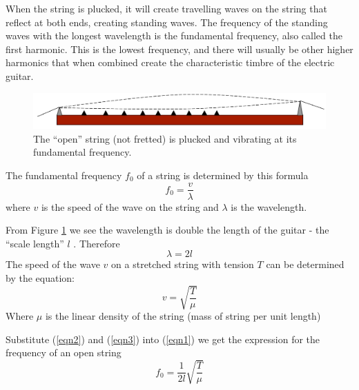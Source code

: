 
When the string is plucked, it will create travelling waves on the string that reflect at both ends, creating standing waves. The frequency of the standing waves with the longest wavelength is the fundamental frequency, also called the first harmonic. This is the lowest frequency, and there will usually be other higher harmonics that when combined create the characteristic timbre of the electric guitar. 
\begin{figure}[h]
    \includegraphics[width=\textwidth]{./ee/fig2.png}
    \caption{The “open” string (not fretted) is plucked and vibrating at its fundamental frequency.}\label{fig2}
\end{figure} 

The fundamental frequency $f_0$ of a string is determined by this formula
\begin{equation}\label{eqn1}
    f_0 = \frac{v}{\lambda}
\end{equation}
where $v$ is the speed of the wave on the string and $\lambda$ is the wavelength. \cite{eqn1} \par 
From Figure \ref{fig2} we see the wavelength is double the length of the guitar - the “scale length” $l$ . Therefore \begin{equation}\label{eqn2}
    \lambda = 2l
\end{equation}
The speed of the wave $v$ on a stretched string with tension $T$ can be determined by the equation:
\begin{equation}\label{eqn3}
    v = \sqrt{\frac{T}{\mu}} 
\end{equation}
Where $\mu$ is the linear density of the string (mass of string per unit length) \cite{eqn3}\par
Substitute (\ref{eqn2}) and (\ref{eqn3}) into (\ref{eqn1}) we get the expression for the frequency of an open string
\begin{equation}\label{eqn4}
    f_0 = \frac{1}{2l}\sqrt{\frac{T}{\mu}}
\end{equation}
